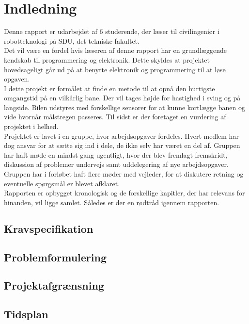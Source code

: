 \section{Indledning}

Denne rapport er udarbejdet af 6 studerende, der læser til civilingeniør i robotteknologi på SDU, det tekniske fakultet.\\

Det vil være en fordel hvis læseren af denne rapport har en grundlæggende kendskab til programmering og elektronik. Dette skyldes at projektet hovedsageligt går ud på at benytte elektronik og programmering til at løse opgaven.\\

I dette projekt er formålet at finde en metode til at opnå den hurtigste omgangstid på en vilkårlig bane. Der vil tages højde for hastighed i sving og på langside. Bilen udstyres med forskellige sensorer for at kunne kortlægge banen og vide hvornår målstregen passeres. Til sidst er der foretaget en vurdering af projektet i helhed.\\

Projektet er lavet i en gruppe, hvor arbejdsopgaver fordeles. Hvert medlem har dog ansvar for at sætte sig ind i dele, de ikke selv har været en del af. Gruppen har haft møde en mindst gang ugentligt, hvor der blev fremlagt fremskridt, diskussion af problemer undervejs samt uddelegering af nye arbejdsopgaver. Gruppen har i forløbet haft flere møder med vejleder, for at diskutere retning og eventuelle spørgsmål er blevet afklaret.\\

Rapporten er opbygget kronologisk og de forskellige kapitler, der har relevans for hinanden, vil ligge samlet. Således er der en rødtråd igennem rapporten.\\

\subsection{Kravspecifikation}

\subsection{Problemformulering}

\subsection{Projektafgrænsning}

\subsection{Tidsplan}
